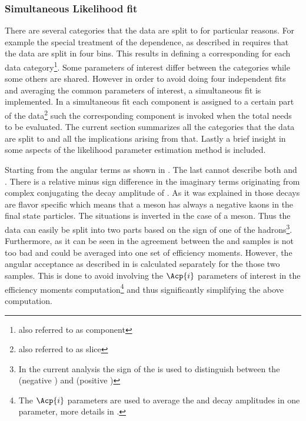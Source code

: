 \subsubsection{Simultaneous Likelihood fit}
\label{Simutaneous_Likelihood_fit}
There are several categories that the data are split to for particular reasons. 
For example the special treatment of the \mkpi dependence, as described in  requires that the data are
split in four \mkpi bins. This results in defining a corresponding \pdf for each data category\footnote{also referred to as component \pdf}.
Some parameters of interest differ between the categories while some others are shared. 
However in order to avoid doing four independent fits and averaging the common parameters of interest, 
a simultaneous fit is implemented. In a simultaneous fit each component \pdf is assigned to a certain part of the data\footnote{also referred to as slice} 
such the corresponding component \pdf is invoked when the total \pdf needs to be evaluated. The current section summarizes
all the categories that the data are split to and all the implications arising from that. Lastly a brief insight in some aspects
of the likelihood parameter estimation method is included. 

Starting from the angular \pdf terms as shown in . The last cannot describe both \BsJpsiKst and \BsbarJpsiKst. 
There is a relative minus sign difference in the imaginary terms originating from complex conjugating the decay amplitude of 
\BsJpsiKst. As it was explained in  those decays are flavor specific which means that a \Bs meson
has always a negative kaons in the final state particles. The situations is inverted in the case of a \Bsb meson.
Thus the data can easily be split into two parts based on the sign of one of the hadrons\footnote{In the current analysis the sign
of the \kaon is used to distinguish between the \BsJpsiKst (negative \kaon) and \BsbarJpsiKst (positive \kaon) }.
Furthermore, as it can be seen in  the agreement between the \BsJpsiKst and \BsbarJpsiKst samples is not too 
bad and could be averaged into one set of efficiency moments. However, the angular acceptance as described in 
is calculated separately for the those two samples. This is done to avoid involving the $\Acp{i}$ parameters of interest
in the efficiency moments computation\footnote{The $\Acp{i}$ parameters are used to average the \BsJpsiKst and \BsbarJpsiKst decay amplitudes in one parameter,
more details in .} and thus significantly simplifying the above computation.

